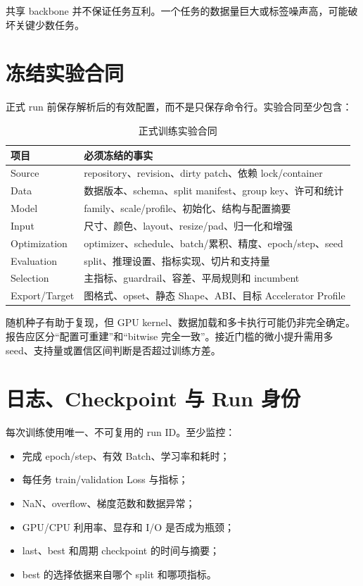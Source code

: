 共享 backbone 并不保证任务互利。一个任务的数据量巨大或标签噪声高，可能破坏关键少数任务。

\section{冻结实验合同}

正式 run 前保存解析后的有效配置，而不是只保存命令行。实验合同至少包含：

\begin{table}[H]
  \centering
  \caption{正式训练实验合同}
  \begin{tabular}{p{25mm}p{109mm}}
    \hline
    项目 & 必须冻结的事实 \\
    \hline
    Source & repository、revision、dirty patch、依赖 lock/container \\
    Data & 数据版本、schema、split manifest、group key、许可和统计 \\
    Model & family、scale/profile、初始化、结构与配置摘要 \\
    Input & 尺寸、颜色、layout、resize/pad、归一化和增强 \\
    Optimization & optimizer、schedule、batch/累积、精度、epoch/step、seed \\
    Evaluation & split、推理设置、指标实现、切片和支持量 \\
    Selection & 主指标、guardrail、容差、平局规则和 incumbent \\
    Export/Target & 图格式、opset、静态 Shape、ABI、目标 Accelerator Profile \\
    \hline
  \end{tabular}
\end{table}

随机种子有助于复现，但 GPU kernel、数据加载和多卡执行可能仍非完全确定。报告应区分“配置可重建”和“bitwise 完全一致”。接近门槛的微小提升需用多 seed、支持量或置信区间判断是否超过训练方差。

\section{日志、Checkpoint 与 Run 身份}

每次训练使用唯一、不可复用的 run ID。至少监控：

\begin{itemize}
  \item 完成 epoch/step、有效 Batch、学习率和耗时；
  \item 每任务 train/validation Loss 与指标；
  \item NaN、overflow、梯度范数和数据异常；
  \item GPU/CPU 利用率、显存和 I/O 是否成为瓶颈；
  \item last、best 和周期 checkpoint 的时间与摘要；
  \item best 的选择依据来自哪个 split 和哪项指标。
\end{itemize}

